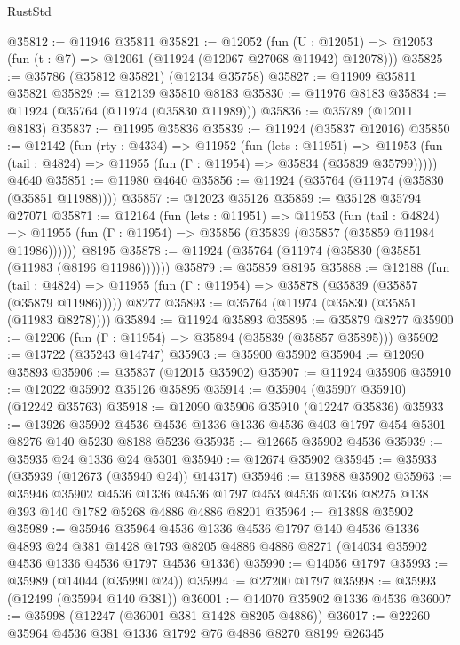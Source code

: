 \begin{lexlean}{RustStd}
\begin{coremodule}
@35812 := @11946 @35811
@35821 := @12052
    (fun (U : @12051) => @12053 (fun (t : @7) => @12061 (@11924 (@12067 @27068 @11942) @12078)))
@35825 := @35786 (@35812 @35821) (@12134 @35758)
@35827 := @11909 @35811 @35821
@35829 := @12139 @35810 @8183
@35830 := @11976 @8183
@35834 := @11924 (@35764 (@11974 (@35830 @11989)))
@35836 := @35789 (@12011 @8183)
@35837 := @11995 @35836
@35839 := @11924 (@35837 @12016)
@35850 := @12142
    (fun (rty : @4334) =>
    @11952
      (fun (lets : @11951) =>
      @11953 (fun (tail : @4824) => @11955 (fun (Γ : @11954) => @35834 (@35839 @35799)))))
    @4640
@35851 := @11980 @4640
@35856 := @11924 (@35764 (@11974 (@35830 (@35851 @11988))))
@35857 := @12023 @35126
@35859 := @35128 @35794 @27071
@35871 := @12164
    (fun (lets : @11951) =>
    @11953
      (fun (tail : @4824) =>
      @11955 (fun (Γ : @11954) => @35856 (@35839 (@35857 (@35859 @11984 @11986))))))
    @8195
@35878 := @11924 (@35764 (@11974 (@35830 (@35851 (@11983 (@8196 @11986))))))
@35879 := @35859 @8195
@35888 := @12188
    (fun (tail : @4824) => @11955 (fun (Γ : @11954) => @35878 (@35839 (@35857 (@35879 @11986)))))
    @8277
@35893 := @35764 (@11974 (@35830 (@35851 (@11983 @8278))))
@35894 := @11924 @35893
@35895 := @35879 @8277
@35900 := @12206 (fun (Γ : @11954) => @35894 (@35839 (@35857 @35895)))
@35902 := @13722 (@35243 @14747)
@35903 := @35900 @35902
@35904 := @12090 @35893
@35906 := @35837 (@12015 @35902)
@35907 := @11924 @35906
@35910 := @12022 @35902 @35126 @35895
@35914 := @35904 (@35907 @35910) (@12242 @35763)
@35918 := @12090 @35906 @35910 (@12247 @35836)
@35933 := @13926
    @35902
    @4536
    @4536
    @1336
    @1336
    @4536
    @403
    @1797
    @454
    @5301
    @8276
    @140
    @5230
    @8188
    @5236
@35935 := @12665 @35902 @4536
@35939 := @35935 @24 @1336 @24 @5301
@35940 := @12674 @35902
@35945 := @35933 (@35939 (@12673 (@35940 @24)) @14317)
@35946 := @13988 @35902
@35963 := @35946
    @35902
    @4536
    @1336
    @4536
    @1797
    @453
    @4536
    @1336
    @8275
    @138
    @393
    @140
    @1782
    @5268
    @4886
    @4886
    @8201
@35964 := @13898 @35902
@35989 := @35946
    @35964
    @4536
    @1336
    @4536
    @1797
    @140
    @4536
    @1336
    @4893
    @24
    @381
    @1428
    @1793
    @8205
    @4886
    @4886
    @8271
    (@14034 @35902 @4536 @1336 @4536 @1797 @4536 @1336)
@35990 := @14056 @1797
@35993 := @35989 (@14044 (@35990 @24))
@35994 := @27200 @1797
@35998 := @35993 (@12499 (@35994 @140 @381))
@36001 := @14070 @35902 @1336 @4536
@36007 := @35998 (@12247 (@36001 @381 @1428 @8205 @4886))
@36017 := @22260 @35964 @4536 @381 @1336 @1792 @76 @4886 @8270 @8199 @26345

\end{coremodule}
\end{lexlean}
